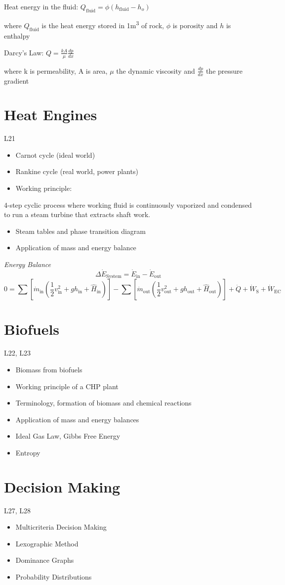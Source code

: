 \documentclass[a4paper, 12pt]{article}
\begin{document}
Heat energy in the fluid:
$  Q_{\text{fluid}} = \phi (h_{\text{fluid}}-h_o) $

{\scriptsize where $Q_{\text{fluid}}$ is the heat energy stored in 1m\textsuperscript{3} of rock, $\phi$ is porosity and $h$ is enthalpy\/}

Darcy's Law:
$ Q = \frac{kA}{\mu} \frac{dp}{dx} $

{\scriptsize where k is permeability, A is area, $\mu$ the dynamic viscosity and $\frac{dp}{dx}$ the pressure gradient\/}

\section*{Heat Engines}
L21
\begin{itemize}
  \item Carnot cycle (ideal world)
  \item Rankine cycle (real world, power plants)
  \item Working principle:
\end{itemize}
4-step cyclic process where working fluid is continuously vaporized and condensed 
to run a steam turbine that extracts shaft work.
\begin{itemize}
  \item Steam tables and phase transition diagram
  \item Application of mass and energy balance
\end{itemize}

\textit{Energy Balance}
\begin{equation*}
  \Delta \dot{E}_{\text{System}} = \dot{E}_{\text{in}} - \dot{E}_{\text{out}}  
\end{equation*}
\begin{equation*}
0 = \sum[\dot{m}_{\text{in}}(\frac{1}{2} v_{\text{in}}^2+gh_{\text{in}} + \hat{H}_{\text{in}})] - \sum[\dot{m}_{\text{out}}(\frac{1}{2} v_{\text{out}}^2+gh_{\text{out}} + \hat{H}_{\text{out}})] + \dot{Q} + \dot{W}_{\text{S}} + \dot{W}_{\text{EC}}
\end{equation*}

\section*{Biofuels}
L22, L23
\begin{itemize}
  \item Biomass from biofuels
  \item Working principle of a CHP plant
  \item Terminology, formation of biomass and chemical reactions
  \item Application of mass and energy balances
  \item Ideal Gas Law, Gibbs Free Energy
  \item Entropy
\end{itemize}

\section*{Decision Making}
L27, L28
\begin{itemize}
  \item Multicriteria Decision Making
  \item Lexographic Method
  \item Dominance Graphs
  \item Probability Distributions
\end{itemize}
\end{document}
